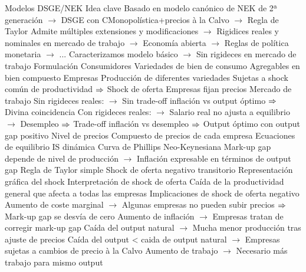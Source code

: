 \documentclass{nuevotema}
\begin{document}
\begin{esquemal}
		\2 Modelos DSGE/NEK
			\3 Idea clave
				\4 Basado en modelo canónico de NEK de 2ª generación
				\4[] $\to$ DSGE con CMonopolística+precios à la Calvo
				\4[] $\to$ Regla de Taylor
				\4[] Admite múltiples extensiones y modificaciones
				\4[] $\to$ Rigidices reales y nominales en mercado de trabajo
				\4[] $\to$ Economía abierta
				\4[] $\to$ Reglas de política monetaria
				\4[] $\to$ ...
				\4[] Caracterizamos modelo básico
				\4[] $\to$ Sin rigideces en mercado de trabajo
			\3 Formulación
				\4 Consumidores
				\4[] Variedades de bien de consumo
				\4[] Agregables en bien compuesto
				\4 Empresas
				\4[] Producción de diferentes variedades
				\4[] Sujetas a shock común de productividad
				\4[] $\Rightarrow$ Shock de oferta
				\4[] Empresas fijan precios
				\4 Mercado de trabajo
				\4[] Sin rigideces reales:
				\4[] $\to$ Sin trade-off inflación vs output óptimo
				\4[] $\Rightarrow$ Divina coincidencia
				\4[] Con rigideces reales:
				\4[] $\to$ Salario real no ajusta a equilibrio
				\4[] $\to$ Desempleo
				\4[] $\Rightarrow$ Trade-off inflación vs desempleo
				\4[] $\Rightarrow$ Output óptimo con output gap positivo
				\4 Nivel de precios
				\4[] Compuesto de precios de cada empresa
				\4 Ecuaciones de equilibrio
				\4[DIS] IS dinámica
				\4[] 
				\4[NKPC] Curva de Phillips Neo-Keynesiana
				\4[] 
				\4[] Mark-up gap depende de nivel de producción
				\4[] $\to$ Inflación expresable en términos de output gap
				\4[TR] Regla de Taylor simple
				\4[] 
			\3 Shock de oferta negativo transitorio
				\4 Representación gráfica del shock
				\4[] 
				\4 Interpretación de shock de oferta
				\4[] Caída de la productividad general que afecta a todas las empresas
				\4 Implicaciones de shock de oferta negativo
				\4[] Aumento de coste marginal
				\4[] $\to$ Algunas empresas no pueden subir precios
				\4[] $\Rightarrow$ Mark-up gap se desvía de cero
				\4[] Aumento de inflación
				\4[] $\to$ Empresas tratan de corregir mark-up gap
				\4[] Caída del output natural
				\4[] $\to$ Mucha menor producción tras ajuste de precios
				\4[] Caída del output < caida de output natural
				\4[] $\to$ Empresas sujetas a cambios de precio à la Calvo
				\4[] Aumento de trabajo
				\4[] $\to$ Necesario más trabajo para mismo output

\end{esquemal}
\end{document}
